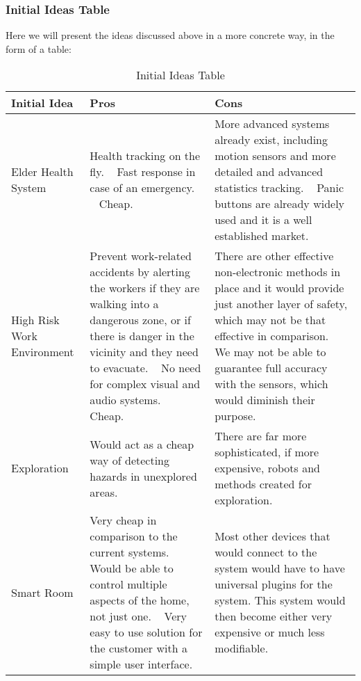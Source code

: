 \documentclass[../document]{subfiles}
\begin{document}
\subsubsection{Initial Ideas Table}
Here we will present the ideas discussed above in a more concrete way, in the form of a table:

\begin{table}[H]
\centering
\caption{Initial Ideas Table}
\begin{tabularx}{\textwidth}{|L{2.5cm}|X|X|}
	\hline
	\textbf{Initial Idea}
	&\textbf{Pros}
	&\textbf{Cons}
	\\ \hline Elder Health System
	&Health tracking on the fly.
	\newline \ \newline
	Fast response in case of an emergency.
	\newline \ \newline
	Cheap.
	&More advanced systems already exist, including motion sensors and more detailed and advanced statistics tracking.
	\newline \ \newline
	Panic buttons are already widely used and it is a well established market.
	\\ \hline High Risk Work Environment
	&Prevent work-related accidents by alerting the workers if they are walking into a dangerous zone, or if there is danger in the vicinity and they need to evacuate.
	\newline \ \newline
	No need for complex visual and audio systems.
	\newline \ \newline
	Cheap.
	&There are other effective non-electronic methods in place and it would provide just another layer of safety, which may not be that effective in comparison.
	\newline \ \newline
	We may not be able to guarantee full accuracy with the sensors, which would diminish their purpose.
	\\ \hline Exploration
	&Would act as a cheap way of detecting hazards in unexplored areas.
	&There are far more sophisticated, if more expensive, robots and methods created for exploration.
	\\ \hline Smart Room
	&Very cheap in comparison to the current systems.
	\newline \ \newline
	Would be able to control multiple aspects of the home, not just one.
	\newline \ \newline
	Very easy to use solution for the customer with a simple user interface.
	&Most other devices that would connect to the system would have to have universal plugins for the system. This system would then become either very expensive or much less modifiable.
	\\ \hline 
\end{tabularx}
\end{table}
\end{document}
